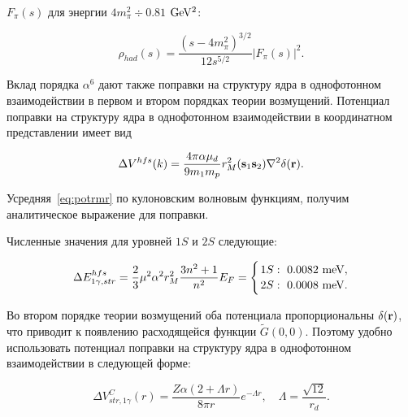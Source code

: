 $F_\pi(s)$ для энергии $4m_\pi^2\div 0.81$ $\rm GeV^2$:

\begin{equation}

\label{eq:ffpi}

\rho_{had}(s)=\frac{(s-4m_\pi^2)^{3/2}}{12s^{5/2}}|F_\pi(s)|^2.

\end{equation}



Вклад порядка $\alpha^6$ дают также поправки на структуру ядра в однофотонном взаимодействии в первом и втором порядках теории возмущений. Потенциал поправки на структуру ядра в однофотонном взаимодействии в координатном представлении имеет вид

\begin{equation}

\label{eq:potrmr}

\Delta V^{hfs}(k)=\frac{4\pi\alpha\mu_d}{9m_1m_p}r_M^2({\bf s}_1{\bf s}_2)\nabla^2\delta({\bf r}).

\end{equation}

Усредняя~\eqref{eq:potrmr} по кулоновским волновым функциям, получим аналитическое выражение для поправки.

Численные значения для уровней $1S$ и $2S$ следующие:

\begin{equation}

\label{eq:corrm}

\Delta E^{hfs}_{1\gamma,str}=\frac{2}{3}\mu^2\alpha^2r_M^2\frac{3n^2+1}{n^2}E_F=

\Biggl\{{{1S:~0.0082~\rm meV,}\atop{2S:~\rm 0.0008~meV.}}

\end{equation}







Во втором порядке теории возмущений оба потенциала пропорциональны $\delta({\bf r})$, что приводит к появлению расходящейся функции $\tilde G(0, 0)$. Поэтому удобно использовать потенциал поправки на структуру ядра в однофотонном взаимодействии в следующей форме:

\begin{equation}

\label{eq:pot_lam}

\Delta V^C_{str, 1\gamma}(r)=\frac{Z\alpha(2+\Lambda r)}{8\pi r}e^{-\Lambda r},\quad 

\Lambda=\frac{\sqrt{12}}{r_d}.

\end{equation}

